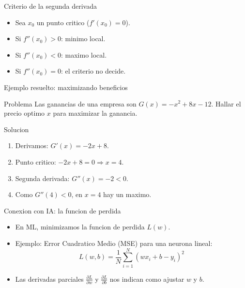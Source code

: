 \documentclass[aspectratio=169, 10pt, xcolor=table]{beamer}
\begin{document}
\begin{frame}{Criterio de la segunda derivada}
    \begin{itemize}
        \item Sea $x_0$ un punto critico ($f'(x_0)=0$).
        \item Si $f''(x_0) > 0$: minimo local.
        \item Si $f''(x_0) < 0$: maximo local.
        \item Si $f''(x_0) = 0$: el criterio no decide.
    \end{itemize}
\end{frame}

\begin{frame}{Ejemplo resuelto: maximizando beneficios}
    \begin{exampleblock}{Problema}
        Las ganancias de una empresa son $G(x) = -x^2 + 8x - 12$. Hallar el precio optimo $x$ para maximizar la ganancia.
    \end{exampleblock}
    \begin{block}{Solucion}
        \begin{enumerate}
            \item Derivamos: $G'(x) = -2x + 8$.
            \item Punto critico: $-2x+8=0 \Rightarrow x=4$.
            \item Segunda derivada: $G''(x) = -2 < 0$.
            \item Como $G''(4)<0$, en $x=4$ hay un maximo.
        \end{enumerate}
    \end{block}
\end{frame}

\begin{frame}{Conexion con IA: la funcion de perdida}
    \begin{itemize}
        \item En ML, minimizamos la funcion de perdida $L(w)$.
        \item Ejemplo: Error Cuadratico Medio (MSE) para una neurona lineal:
        \[
        L(w,b) = \frac{1}{N}\sum_{i=1}^{N} (wx_i + b - y_i)^2
        \]
        \item Las derivadas parciales $\frac{\partial L}{\partial w}$ y $\frac{\partial L}{\partial b}$ nos indican como ajustar $w$ y $b$.
    \end{itemize}
\end{frame}

\end{document}
